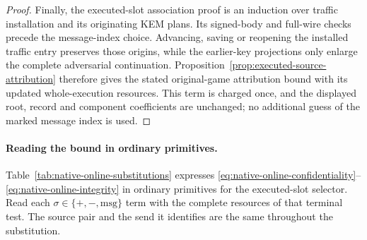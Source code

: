 \documentclass[pdflatex]{sn-jnl}
\theoremstyle{thmstyleone}
\theoremstyle{thmstylethree}
\theoremstyle{thmstyletwo}
\begin{document}
\begin{proof}
Finally, the executed-slot association proof is an induction over
traffic installation and its originating KEM plans. Its signed-body
and full-wire checks precede the message-index choice. Advancing,
saving or reopening the installed traffic entry preserves those
origins, while the earlier-key projections only enlarge the complete
adversarial continuation. Proposition~\ref{prop:executed-source-attribution}
therefore gives the stated original-game attribution bound with
its updated whole-execution resources. This term is charged once,
and the displayed root, record and component coefficients are unchanged;
no additional guess of the marked message index is used.
\end{proof}

\paragraph{Reading the bound in ordinary primitives.}
Table~\ref{tab:native-online-substitutions} expresses
\eqref{eq:native-online-confidentiality}--\eqref{eq:native-online-integrity}
in ordinary primitives for the executed-slot selector. Read each
$\sigma\in\{+,-,\mathrm{msg}\}$ term with the complete resources of
that terminal test. The source pair and the send it identifies are the
same throughout the substitution.
\end{document}
